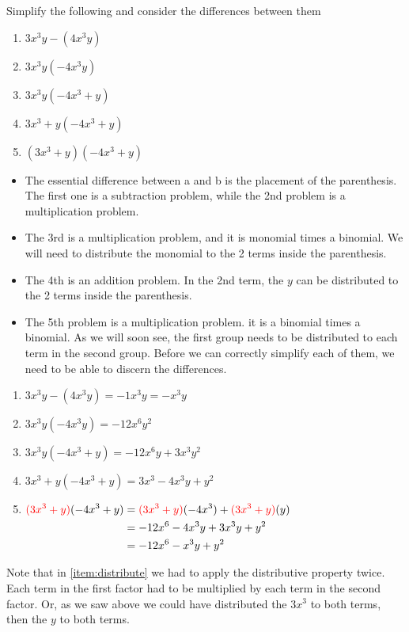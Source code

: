 \begin{myexample}
Simplify the following and consider the differences between them
\begin{enumerate}
	\item $3x^3y-(4x^3y)$
	\item $3x^3y(-4x^3y)$
	\item $3x^3y(-4x^3+y)$
	\item $3x^3+y(-4x^3+y)$
	\item $(3x^3+y)(-4x^3+y)$
\end{enumerate}
\end{myexample}
\begin{myProof}
	\begin{itemize}
		\item The essential difference between a and b is the placement of the parenthesis. The first
		one is a subtraction problem, while the 2nd problem is a multiplication problem.
		\item The 3rd is a multiplication problem, and it is monomial times a binomial. We will need to distribute the monomial to the 2 terms inside the parenthesis.
		\item The 4th is an addition problem. In the 2nd term, the $y$ can be distributed to the
		2 terms inside the parenthesis. 
		\item The 5th problem is a multiplication problem. it is a binomial times a binomial. As we will soon see, the first
		group needs to be distributed to each term in the second group. Before we can correctly 
		simplify each of them, we need to be able to discern the differences.
	\end{itemize}
		
	\begin{enumerate}
		\item $3x^3y-(4x^3y) = -1x^3y = -x^3y$
		\item $3x^3y(-4x^3y) = -12x^6y^2$
		\item $3x^3y(-4x^3+y) = -12x^6y+3x^3y^2$
		\item $3x^3+y(-4x^3+y) = 3x^3-4x^3y+y^2$
		\item \label{item:distribute}
		$\begin{aligned}[t]
			{\color{red}(3x^3+y)}(-4x^3+y) & =	{\color{red}(3x^3+y)}(-4x^3)+{\color{red}(3x^3+y)}(y) \\
			                               & =	-12x^6-4x^3y+3x^3y+y^2                                \\
			                               & =	-12x^6-x^3y+y^2                                       
		\end{aligned}$
	\end{enumerate}
	Note that in \ref{item:distribute} we had to apply the distributive property twice. Each term in the first factor
	had to be multiplied by each term in the second factor. Or, as we saw above we could 
	have distributed the $3x^3$ to both terms, then the $y$ to both terms.
	
\end{myProof}

